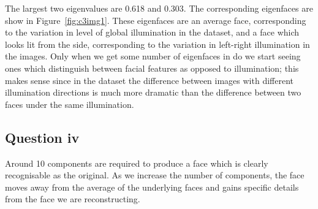 \documentclass[a4paper]{article}
\begin{document}
The largest two eigenvalues are 0.618 and 0.303. The corresponding eigenfaces are show in Figure~\ref{fig:c3img1}. These eigenfaces are an average face, corresponding to the variation in level of global illumination in the dataset, and a face which looks lit from the side, corresponding to the variation in left-right illumination in the images. Only when we get some number of eigenfaces in do we start seeing ones which distinguish between facial features as opposed to illumination; this makes sense since in the dataset the difference between images with different illumination directions is much more dramatic than the difference between two faces under the same illumination.

\FloatBarrier

\subsection*{Question iv}
Around 10 components are required to produce a face which is clearly recognisable as the original. As we increase the number of components, the face moves away from the average of the underlying faces and gains specific details from the face we are reconstructing.
\end{document}
